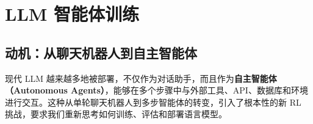 \chapter{LLM 智能体训练}
\label{llm-agentic-training}

\section{动机：从聊天机器人到自主智能体}
\label{motivation-from-chatbots-to-autonomous-agents}

现代 LLM 越来越多地被部署，不仅作为对话助手，而且作为\textbf{自主智能体（Autonomous Agents）}，能够在多个步骤中与外部工具、API、数据库和环境进行交互。这种从单轮聊天机器人到多步智能体的转变，引入了根本性的新 RL 挑战，要求我们重新思考如何训练、评估和部署语言模型。

